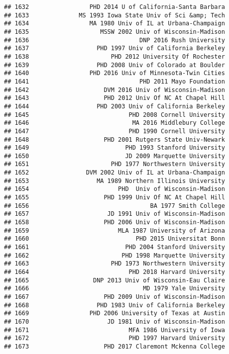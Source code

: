\documentclass[
]{article}
\begin{document}
\begin{verbatim}
## 1632                 PHD 2014 U of California-Santa Barbara
## 1633              MS 1993 Iowa State Univ of Sci &amp; Tech
## 1634                 MA 1980 Univ of IL at Urbana-Champaign
## 1635                    MSSW 2002 Univ of Wisconsin-Madison
## 1636                               DNP 2016 Rush University
## 1637                   PHD 1997 Univ of California Berkeley
## 1638                       PHD 2012 University Of Rochester
## 1639                   PHD 2008 Univ of Colorado at Boulder
## 1640                 PHD 2016 Univ of Minnesota-Twin Cities
## 1641                               PHD 2011 Mayo Foundation
## 1642                     DVM 2016 Univ of Wisconsin-Madison
## 1643                     PHD 2012 Univ Of NC At Chapel Hill
## 1644                   PHD 2003 Univ of California Berkeley
## 1645                            PHD 2008 Cornell University
## 1646                             MA 2016 Middlebury College
## 1647                            PHD 1990 Cornell University
## 1648                     PHD 2001 Rutgers State Univ-Newark
## 1649                           PHD 1993 Stanford University
## 1650                           JD 2009 Marquette University
## 1651                       PHD 1977 Northwestern University
## 1652                DVM 2002 Univ of IL at Urbana-Champaign
## 1653                   MA 1989 Northern Illinois University
## 1654                         PHD  Univ of Wisconsin-Madison
## 1655                     PHD 1999 Univ Of NC At Chapel Hill
## 1656                                  BA 1977 Smith College
## 1657                      JD 1991 Univ of Wisconsin-Madison
## 1658                     PHD 2006 Univ of Wisconsin-Madison
## 1659                         MLA 1987 University of Arizona
## 1660                              PHD 2015 Universitat Bonn
## 1661                           PHD 2004 Stanford University
## 1662                          PHD 1998 Marquette University
## 1663                       PHD 1973 Northwestern University
## 1664                            PHD 2018 Harvard University
## 1665                  DNP 2013 Univ of Wisconsin-Eau Claire
## 1666                                MD 1979 Yale University
## 1667                     PHD 2009 Univ of Wisconsin-Madison
## 1668                   PHD 1983 Univ of California Berkeley
## 1669                 PHD 2006 University of Texas at Austin
## 1670                      JD 1981 Univ of Wisconsin-Madison
## 1671                            MFA 1986 University of Iowa
## 1672                            PHD 1997 Harvard University
## 1673                     PHD 2017 Claremont Mckenna College

\end{verbatim}
\end{document}
